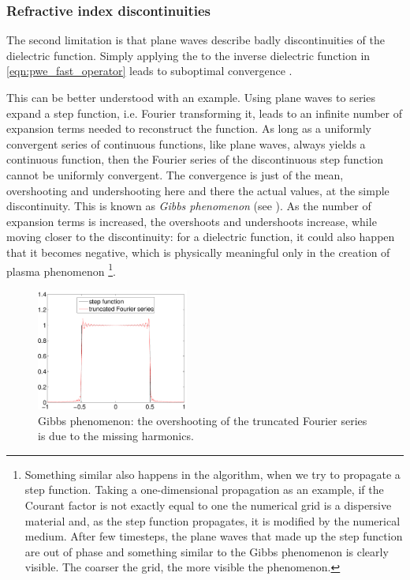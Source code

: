 \subsubsection{Refractive index discontinuities}

The second limitation is that plane waves describe badly
discontinuities of the dielectric function. Simply applying the \IFFT
to the inverse dielectric function in \ref{eqn:pwe_fast_operator}
leads to suboptimal convergence \cite{villeneuve_photonic}.

This can be better understood with an example. Using plane waves to
series expand a step function, i.e. Fourier transforming it, leads to
an infinite number of expansion terms needed to reconstruct the
function. As long as a uniformly convergent series of continuous
functions, like plane waves, always yields a continuous function, then
the Fourier series of the discontinuous step function cannot be
uniformly convergent. The convergence is just of the mean,
overshooting and undershooting here and there the actual values, at
the simple discontinuity. This is known as \emph{Gibbs phenomenon}
(see ). As the number of expansion terms is
increased, the overshoots and undershoots increase, while moving
closer to the discontinuity: for a dielectric function, it could also
happen that it becomes negative, which is physically meaningful only
in the creation of plasma phenomenon
\footnote{Something similar also happens in the \FDTD
algorithm, when we try to propagate a step function. Taking a
one-dimensional propagation as an example, if the Courant factor is
not exactly equal to one the numerical grid is a dispersive material
\cite{taflove_computational} and, as the step function propagates, it
is modified by the numerical medium. After few timesteps, the plane
waves that made up the step function are out of phase and something
similar to the Gibbs phenomenon is clearly visible. The coarser the
grid, the more visible the phenomenon.}.

\begin{figure}[htbp]
  \begin{center}
    \includegraphics[width=5cm]{pics/gibbs}
  \end{center}
  \caption{Gibbs phenomenon: the overshooting of the truncated Fourier
    series is due to the missing harmonics.}
  \label{fig:gibbs}
\end{figure}

